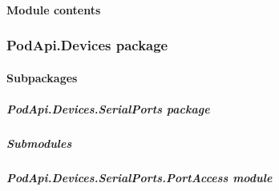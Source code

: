 \documentclass[letterpaper,10pt,english]{sphinxmanual}
\begin{document}
\paragraph{Module contents}
\label{\detokenize{PodApi.Commands:module-PodApi.Commands}}\label{\detokenize{PodApi.Commands:module-contents}}
\sphinxstepscope


\subsubsection{PodApi.Devices package}
\label{\detokenize{PodApi.Devices:podapi-devices-package}}\label{\detokenize{PodApi.Devices::doc}}

\paragraph{Subpackages}
\label{\detokenize{PodApi.Devices:subpackages}}
\sphinxstepscope


\subparagraph{PodApi.Devices.SerialPorts package}
\label{\detokenize{PodApi.Devices.SerialPorts:podapi-devices-serialports-package}}\label{\detokenize{PodApi.Devices.SerialPorts::doc}}

\subparagraph{Submodules}
\label{\detokenize{PodApi.Devices.SerialPorts:submodules}}

\subparagraph{PodApi.Devices.SerialPorts.PortAccess module}
\label{\detokenize{PodApi.Devices.SerialPorts:module-PodApi.Devices.SerialPorts.PortAccess}}\label{\detokenize{PodApi.Devices.SerialPorts:podapi-devices-serialports-portaccess-module}}
\end{document}
